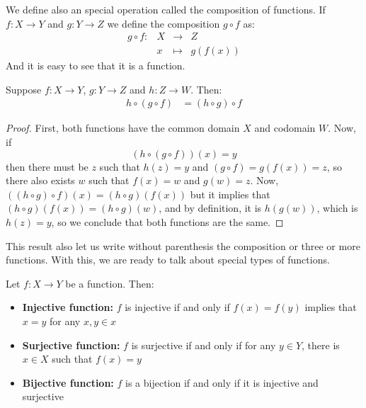 \documentclass{tufte-handout}
\begin{document}
We define also an special operation called the composition of functions. If $f: X \to Y$ and $g: Y \to Z$ we define the composition $g \circ f$ as:
$$\begin{matrix}
	g \circ f: & X &\to & Z\\
	& x &\mapsto & g(f(x))
\end{matrix}$$
And it is easy to see that it is a function.
\begin{theorem}
	Suppose $f: X \to Y$, $g: Y \to Z$ and $h: Z \to W$. Then:
	\begin{align*}
		h \circ (g \circ f) &= (h \circ g) \circ f
	\end{align*}
\end{theorem} 
\begin{proof}
	First, both functions have the common domain $X$ and codomain $W$. Now, if $$(h \circ (g \circ f))(x) = y$$ then there must be $z$ such that $h(z) = y$ and $(g \circ f) = g(f(x)) = z$, so there also exists $w$ such that $f(x) = w$ and $g(w) = z$. Now, $((h \circ g) \circ f)(x) = (h \circ g)(f(x))$ but it implies that $(h \circ g)(f(x)) = (h \circ g)(w)$, and by definition, it is $h(g(w))$, which is $h(z) = y$, so we conclude that both functions are the same.  
\end{proof}

This result also let us write without parenthesis the composition or three or more functions. With this, we are ready to talk about special types of functions.
\begin{definition}
	Let $f: X \to Y$ be a function. Then:
	\begin{itemize}
		\item \textbf{Injective function:} $f$ is injective if and only if $f(x) = f(y)$ implies that $x = y$ for any $x, y \in x$
		\item \textbf{Surjective function:} $f$ is surjective if and only if for any $y \in Y$, there is $x \in X$ such that $f(x) = y$
		\item \textbf{Bijective function:} $f$ is a bijection if and only if it is injective and surjective
	\end{itemize}
\end{definition}
\end{document}

